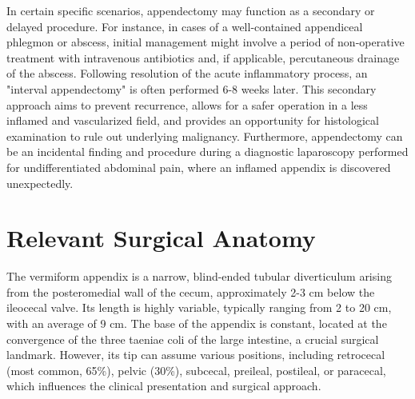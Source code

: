 In certain specific scenarios, appendectomy may function as a secondary or delayed procedure. For instance, in cases of a well-contained appendiceal phlegmon or abscess, initial management might involve a period of non-operative treatment with intravenous antibiotics and, if applicable, percutaneous drainage of the abscess. Following resolution of the acute inflammatory process, an "interval appendectomy" is often performed 6-8 weeks later. This secondary approach aims to prevent recurrence, allows for a safer operation in a less inflamed and vascularized field, and provides an opportunity for histological examination to rule out underlying malignancy. Furthermore, appendectomy can be an incidental finding and procedure during a diagnostic laparoscopy performed for undifferentiated abdominal pain, where an inflamed appendix is discovered unexpectedly.

\section*{Relevant Surgical Anatomy}
The vermiform appendix is a narrow, blind-ended tubular diverticulum arising from the posteromedial wall of the cecum, approximately 2-3 cm below the ileocecal valve. Its length is highly variable, typically ranging from 2 to 20 cm, with an average of 9 cm. The base of the appendix is constant, located at the convergence of the three taeniae coli of the large intestine, a crucial surgical landmark. However, its tip can assume various positions, including retrocecal (most common, 65\%), pelvic (30\%), subcecal, preileal, postileal, or paracecal, which influences the clinical presentation and surgical approach.

